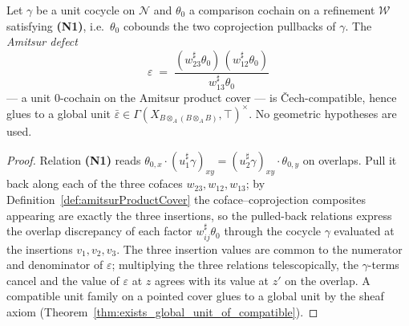 \begin{theorem}
  \label{thm:exists_glued_productDefect}
  \leanok
  Let \(\gamma\) be a unit cocycle on \(\mathcal N\) and \(\theta_0\) a comparison cochain on a
  refinement \(\mathcal W\) satisfying \textbf{(N1)}, i.e.\ \(\theta_0\) cobounds the two
  coprojection pullbacks of \(\gamma\). The \emph{Amitsur defect}
  \[
    \varepsilon \;=\; \frac{(w_{23}^{\sharp}\theta_0)\,(w_{12}^{\sharp}\theta_0)}
      {w_{13}^{\sharp}\theta_0}
  \]
  --- a unit \(0\)-cochain on the Amitsur product cover --- is \v Cech-compatible, hence glues to a
  global unit \(\bar\varepsilon \in \Gamma(X_{B \otimes_A (B \otimes_A B)}, \top)^{\times}\). No
  geometric hypotheses are used.
\end{theorem}
\begin{proof}
  \leanok
  Relation \textbf{(N1)} reads \(\theta_{0,x} \cdot (u_1^{\sharp}\gamma)_{xy} =
  (u_2^{\sharp}\gamma)_{xy} \cdot \theta_{0,y}\) on overlaps. Pull it back along each of the three
  cofaces \(w_{23}, w_{12}, w_{13}\); by Definition~\ref{def:amitsurProductCover} the
  coface--coprojection composites appearing are exactly the three insertions, so the pulled-back
  relations express the overlap discrepancy of each factor \(w_{ij}^{\sharp}\theta_0\) through the
  cocycle \(\gamma\) evaluated at the insertions \(v_1, v_2, v_3\). The three insertion values are
  common to the numerator and denominator of \(\varepsilon\); multiplying the three relations
  telescopically, the \(\gamma\)-terms cancel and the value of \(\varepsilon\) at \(z\) agrees with
  its value at \(z'\) on the overlap. A compatible unit family on a pointed cover glues to a global
  unit by the sheaf axiom (Theorem~\ref{thm:exists_global_unit_of_compatible}).
\end{proof}

